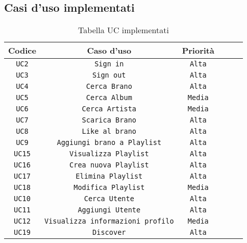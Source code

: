 \subsection{Casi d'uso implementati}
\begin{table} [h!]
    \begin{center}
        \begin{tabular}{ |Sc|Sc|Sc| } 
         \hline
         Codice & Caso d'uso & Priorità \\ 
         \hline
         \hline
         \texttt{UC2} & \texttt{Sign in} & \texttt{Alta} \\ 
         \hline
         \texttt{UC3} & \texttt{Sign out} & \texttt{Alta} \\ 
         \hline
         \texttt{UC4} & \texttt{Cerca Brano} & \texttt{Alta} \\ 
         \hline
         \texttt{UC5} & \texttt{Cerca Album} & \texttt{Media} \\ 
         \hline
         \texttt{UC6} & \texttt{Cerca Artista} & \texttt{Media} \\ 
         \hline
         \texttt{UC7} & \texttt{Scarica Brano} & \texttt{Alta} \\ 
         \hline
         \texttt{UC8} & \texttt{Like al brano} & \texttt{Alta} \\ 
         \hline
         \texttt{UC9} & \texttt{Aggiungi brano a Playlist} & \texttt{Alta} \\ 
         \hline
         \texttt{UC15} & \texttt{Visualizza Playlist} & \texttt{Alta} \\ 
         \hline
         \texttt{UC16} & \texttt{Crea nuova Playlist} & \texttt{Alta} \\ 
         \hline
         \texttt{UC17} & \texttt{Elimina Playlist} & \texttt{Alta} \\ 
         \hline
         \texttt{UC18} & \texttt{Modifica Playlist} & \texttt{Media} \\ 
         \hline
         \texttt{UC10} & \texttt{Cerca Utente} & \texttt{Alta} \\ 
         \hline
         \texttt{UC11} & \texttt{Aggiungi Utente} & \texttt{Alta} \\ 
         \hline
         \texttt{UC12} & \texttt{Visualizza informazioni profilo} & \texttt{Media} \\ 
         \hline
         \texttt{UC19} & \texttt{Discover} & \texttt{Alta} \\ 
         \hline
        \end{tabular}
    \end{center}
    \caption{Tabella UC implementati}
\end{table}
    
